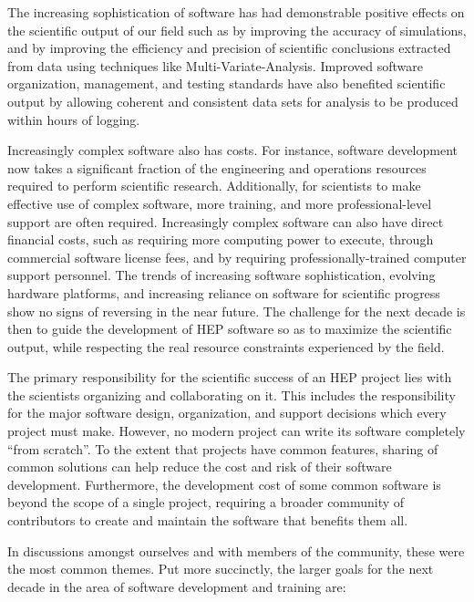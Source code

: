 The increasing sophistication of \HEP software has had demonstrable positive effects on the scientific output of our field
such as by improving the accuracy
of simulations, and by improving the efficiency and precision of scientific conclusions extracted from data using
techniques like Multi-Variate-Analysis.
Improved software organization, management, and testing standards have also benefited scientific output by allowing coherent and consistent data sets for analysis to be produced within hours of logging.

Increasingly complex software also has costs.  For instance, software development now takes a significant fraction
of the engineering and operations resources required to perform
\HEP scientific research.  Additionally, for scientists to
make effective use of complex software, more training, and more professional-level support are often required.
Increasingly complex software can also have direct financial costs, such as requiring more computing power to
execute, through commercial software license fees, and by requiring professionally-trained computer support personnel.
The trends of increasing software sophistication, evolving hardware platforms, and
increasing reliance on software for scientific progress show no signs of reversing in the near future.
The challenge for the next decade is then to guide the development of HEP software so as to maximize the scientific
output, while respecting the real resource constraints experienced by the field.

The primary responsibility for the scientific success of an HEP project lies with the scientists organizing
and collaborating on it.  This includes the responsibility for the major software design, organization,
and support decisions which every project must make.  However, no modern project can write its software completely
``from scratch''.  To the extent that projects have common features, sharing of common solutions can help reduce the
cost and risk of their software development.  Furthermore, the development cost of some common software is beyond the scope of
a single project, requiring a broader community of contributors to create and maintain the software that benefits
them all.  


In discussions amongst ourselves and with members of the \HEP community,
these were the most common themes. Put more succinctly, the larger
goals for the next decade in the area
of software development and training are:

